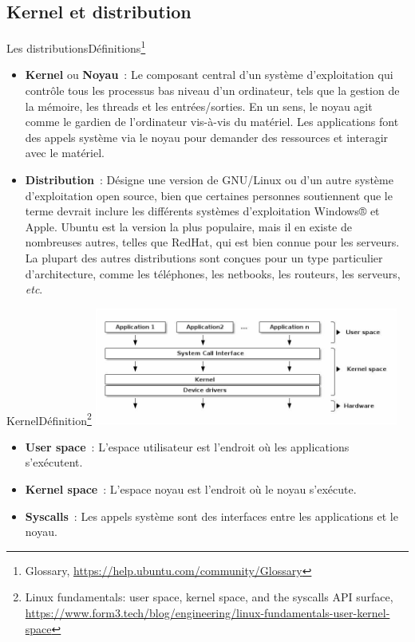 \documentclass{beamer}
\begin{document}
    \subsection{Kernel et distribution}\label{subsec:kernel-et-distribution}

    \begin{frame}{Les distributions}{Définitions\footnote{Glossary, \url{https://help.ubuntu.com/community/Glossary}}}
        \begin{itemize}
            \item \textbf{Kernel} ou \textbf{Noyau}~: Le composant central d'un système d'exploitation qui contrôle tous les processus bas niveau d'un ordinateur, tels que la gestion de la mémoire, les threads et les entrées/sorties.
            En un sens, le noyau agit comme le gardien de l'ordinateur vis-à-vis du matériel.
            Les applications font des appels système via le noyau pour demander des ressources et interagir avec le matériel.
            \item \textbf{Distribution}~: Désigne une version de GNU/Linux ou d'un autre système d'exploitation open source, bien que certaines personnes soutiennent que le terme devrait inclure les différents systèmes d'exploitation Windows® et Apple.
            Ubuntu est la version la plus populaire, mais il en existe de nombreuses autres, telles que RedHat, qui est bien connue pour les serveurs.
            La plupart des autres distributions sont conçues pour un type particulier d'architecture, comme les téléphones, les netbooks, les routeurs, les serveurs, \textit{etc}.
        \end{itemize}
    \end{frame}

    \begin{frame}{Kernel}{Définition\footnote{Linux fundamentals: user space, kernel space, and the syscalls API surface, \url{https://www.form3.tech/blog/engineering/linux-fundamentals-user-kernel-space}}}
        \centering
        \includegraphics[width=10cm]{image/kernel}
        \flushleft
        \begin{itemize}
            \item \textbf{User space}~: L'espace utilisateur est l'endroit où les applications s'exécutent.
            \item \textbf{Kernel space}~: L'espace noyau est l'endroit où le noyau s'exécute.
            \item \textbf{Syscalls}~: Les appels système sont des interfaces entre les applications et le noyau.
        \end{itemize}
    \end{frame}
\end{document}
